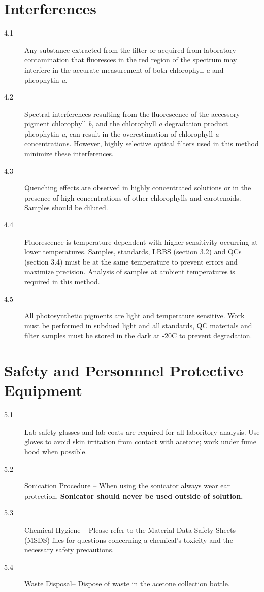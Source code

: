 \documentclass[12pt]{../SOP2}
\begin{document}
\section{Interferences}
\begin{description}
\item[4.1] Any substance extracted from the filter or acquired from laboratory contamination that fluoresces in the red region of the spectrum may interfere in the accurate measurement of both chlorophyll \textit{a} and pheophytin \textit{a}.
\item[4.2] Spectral interferences resulting from the fluorescence of the accessory pigment chlorophyll \textit{b}, and the chlorophyll \textit{a} degradation product pheophytin \textit{a}, can result in the overestimation of chlorophyll \textit{a} concentrations. However, highly selective optical filters used in this method minimize these interferences. 
\item[4.3] Quenching effects are observed in highly concentrated solutions or in the presence of high concentrations of other chlorophylls and carotenoids. Samples should be diluted. 
\item[4.4] Fluorescence is temperature dependent with higher sensitivity occurring at lower temperatures. Samples, standards, LRBS (section 3.2) and QCs (section 3.4) must be at the same temperature to prevent errors and maximize precision. Analysis of samples at ambient temperatures is required in this method. 
\item[4.5] All photosynthetic pigments are light and temperature sensitive. Work must be performed in subdued light and all standards, QC materials and filter samples must be stored in the dark at -20\degree C to prevent degradation.
\end{description}

\section{Safety and Personnnel Protective Equipment}
\begin{description}
\item[5.1] Lab safety-glasses and lab coats are required for all laboritory analysis. Use gloves to avoid skin irritation from contact with acetone; work under fume hood when possible. 
\item[5.2] Sonication Procedure -- When using the sonicator always wear ear protection. \textbf {Sonicator should never be used outside of solution.}
\item[5.3] Chemical Hygiene -- Please refer to the Material Data Safety Sheets (MSDS) files for questions concerning a chemical's toxicity and the necessary safety precautions.
\item[5.4] Waste Disposal-- Dispose of waste in the acetone collection bottle. %
\end{description}
\end{document}
